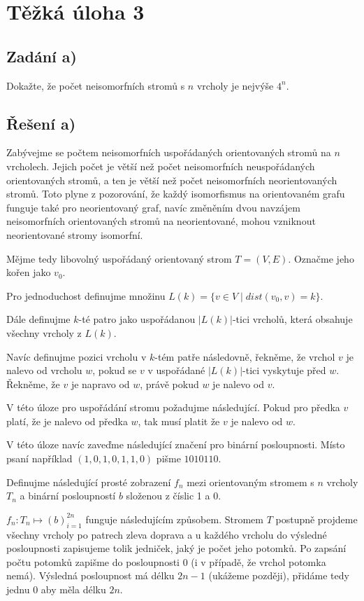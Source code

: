 \documentclass[../main.tex]{subfiles}
\begin{document}
\section{Těžká úloha 3}

\subsection{Zadání a)}
Dokažte, že počet neisomorfních stromů s $n$ vrcholy je nejvýše $4^n$.

\subsection{Řešení a)}

Zabývejme se počtem neisomorfních uspořádaných orientovaných stromů na $n$ vrcholech.
Jejich počet je větší než počet neisomorfních neuspořádaných orientovaných stromů, a ten je větší než počet neisomorfních neorientovaných stromů. 
Toto plyne z pozorování, že 
každý isomorfismus na orientovaném grafu funguje také pro neorientovaný 
graf, navíc změněním dvou navzájem neisomorfních orientovaných stromů na neorientované, 
mohou vzniknout neorientované stromy isomorfní. 

Mějme tedy libovolný uspořádaný orientovaný strom $T=(V,E)$. Označme jeho kořen jako $v_0$.

Pro jednoduchost definujme množinu $L(k) = \{v\in V\mid dist(v_0, v) = k \}$.

Dále definujme $k$-té patro jako uspořádanou $|L(k)|$-tici vrcholů, která obsahuje 
všechny vrcholy z $L(k)$. 

Navíc definujme pozici vrcholu v $k$-tém patře následovně, řekněme, že 
vrchol $v$ je nalevo od vrcholu $w$, pokud se $v$ v uspořádané $|L(k)|$-tici vyskytuje před $w$. 
Řekněme, že $v$ je napravo od $w$, právě pokud $w$ je nalevo od $v$.



V této úloze pro uspořádání stromu požadujme následující. 
Pokud pro předka $v$ platí, že je nalevo od předka $w$, 
tak musí platit že $v$ je nalevo od $w$.

V této úloze navíc zaveďme následující značení pro binární posloupnosti.
Místo psaní například $(1,0,1,0,1,1,0)$ pišme $1010110$.

Definujme následující prosté zobrazení $f_n$ mezi orientovaným stromem s $n$ vrcholy $T_n$ a binární posloupností $b$ složenou z číslic 1 a 0. 

$f_n: T_n\mapsto (b)_{i=1}^{2n}$ funguje následujícím způsobem. 
Stromem $T$ postupně projdeme všechny vrcholy po patrech zleva doprava a u každého vrcholu 
do výsledné posloupnosti 
zapisujeme tolik jedniček, jaký je počet jeho potomků. Po zapsání počtu potomků 
zapišme do posloupnosti 0 (i v případě, že vrchol potomka nemá). Výsledná posloupnost má délku $2n-1$ (ukážeme později), 
přidáme tedy jednu $0$ aby měla délku $2n$.
\end{document}
